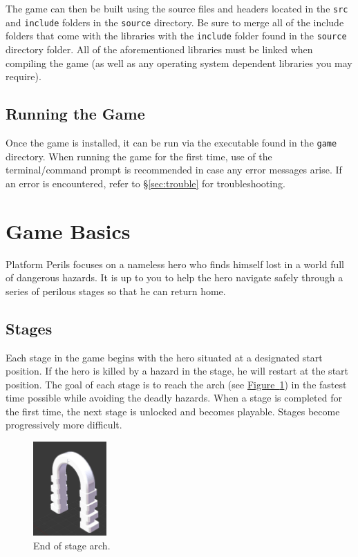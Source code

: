\documentclass[12pt, titlepage]{article}
\begin{document}
\noindent The game can then be built using the source files and headers located in the \texttt{src} and \texttt{include} folders in the \texttt{source} directory.  Be sure to merge all of the include folders that come with the libraries with the \texttt{include} folder found in the \texttt{source} directory folder.  All of the aforementioned libraries must be linked when compiling the game (as well as any operating system dependent libraries you may require).

\subsection{Running the Game}
Once the game is installed, it can be run via the executable found in the \texttt{game} directory.  When running the game for the first time, use of the terminal/command prompt is recommended in case any error messages arise.  If an error is encountered, refer to \hyperref[sec:trouble]{\S\ref*{sec:trouble}} for troubleshooting.


\section{Game Basics}
\label{sec:basics}
Platform Perils focuses on a nameless hero who finds himself lost in a world full of dangerous hazards.  It is up to you to help the hero navigate safely through a series of perilous stages so that he can return home.


\subsection{Stages}
\noindent Each stage in the game begins with the hero situated at a designated start position.  If the hero is killed by a hazard in the stage, he will restart at the start position.  The goal of each stage is to reach the arch (see \hyperref[fig:arch]{Figure~\ref*{fig:arch}}) in the fastest time possible while avoiding the deadly hazards. When a stage is completed for the first time, the next stage is unlocked and becomes playable.  Stages become progressively more difficult.

\begin{figure}[H]
\begin{center}
\includegraphics[width=0.25\textwidth]{door}
\caption{End of stage arch.} \label{fig:arch}
\end{center}
\end{figure}
\end{document}
